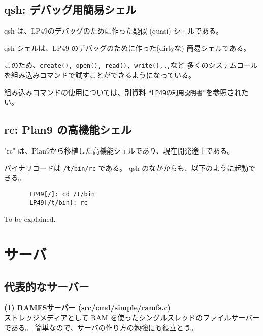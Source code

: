 {\vspace{4cm}

    
    

    

    
\chapter{qsh: デバッグ用簡易シェル}

   qsh は、LP49のデバッグのために作った疑似 (quasi) シェルである。
    
 qsh シェルは、LP49 のデバッグのために作った(dirtyな) 簡易シェルである。

このため、{\tt create(), open(), read(), write(),,,}など
多くのシステムコールを組み込みコマンドで試すことができるようになっている。

組み込みコマンドの使用については、別資料
``{\tt LP49の利用説明書}''を参照されたい。

    
    
\chapter{rc: Plan9 の高機能シェル}

  "rc" は、Plan9から移植した高機能シェルであり、現在開発途上である。

バイナリコードは {\tt /t/bin/rc} である。
qsh のなかからも、以下のように起動できる。
   
\begin{verbatim}
       LP49[/]: cd /t/bin
       LP49[/t/bin]: rc 
\end{verbatim}



To be explained.



\part{サーバ}

\chapter{代表的なサーバー}
{\bf\flushleft  (1) RAMFSサーバー  (src/cmd/simple/ramfs.c)}\\

    ストレッジメディアとして RAM を使ったシングルスレッドのファイルサーバーである。
簡単なので、サーバの作り方の勉強にも役立とう。
  \\

}
